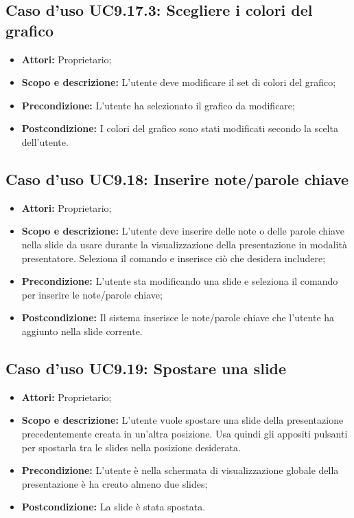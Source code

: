 		\subsection{Caso d'uso UC9.17.3: Scegliere i colori del grafico}
		\begin{itemize}
			\item \textbf{Attori:} Proprietario;
			\item \textbf{Scopo e descrizione:} L'utente deve modificare il set di colori del grafico;
			\item \textbf{Precondizione:} L'utente ha selezionato il grafico da modificare;
			\item \textbf{Postcondizione:} I colori del grafico sono stati modificati secondo la scelta dell'utente.
		\end{itemize}


\subsection{Caso d'uso UC9.18: Inserire note/parole chiave}
\begin{itemize}
	\item \textbf{Attori:} Proprietario;
	\item \textbf{Scopo e descrizione:} L'utente deve inserire delle note o delle parole chiave nella \gls{slide} da usare durante la visualizzazione della presentazione in modalità presentatore. Seleziona il comando e inserisce ciò che desidera includere;
	\item \textbf{Precondizione:} L'utente sta modificando una \gls{slide} e seleziona il comando per inserire le note/parole chiave;
	\item \textbf{Postcondizione:} Il sistema inserisce le note/parole chiave che l'utente ha aggiunto nella \gls{slide} corrente.
\end{itemize}

\subsection{Caso d'uso UC9.19: Spostare una slide}
\begin{itemize}
	\item \textbf{Attori:} Proprietario;
	\item \textbf{Scopo e descrizione:} L'utente vuole spostare una \gls{slide} della presentazione precedentemente creata in un'altra posizione. Usa quindi gli appositi pulsanti per spostarla tra le slides nella posizione desiderata.
	\item \textbf{Precondizione:} L'utente è nella schermata di visualizzazione globale della presentazione è ha creato almeno due slides;
	\item \textbf{Postcondizione:} La \gls{slide} è stata spostata.
\end{itemize}
